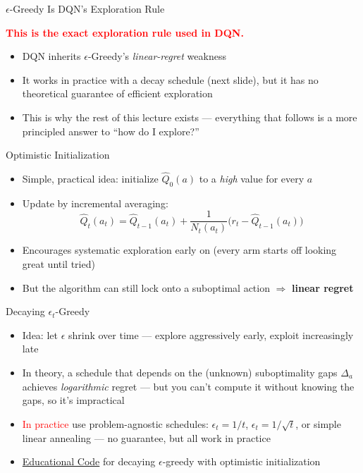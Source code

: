 \begin{frame}{$\epsilon$-Greedy Is DQN's Exploration Rule}
\vspace{0.5em}
\begin{center}
\textcolor{red}{\textbf{This is the exact exploration rule used in DQN.}}
\end{center}
\vspace{1em}
\begin{itemize}
    \setlength{\itemsep}{0.6em}
    \item DQN inherits $\epsilon$-Greedy's \emph{linear-regret} weakness
    \item It works in practice with a decay schedule (next slide), but it has no theoretical guarantee of efficient exploration
    \item This is why the rest of this lecture exists --- everything that follows is a more principled answer to ``how do I explore?''
\end{itemize}
\end{frame}

\begin{frame}{Optimistic Initialization}
\begin{itemize}
    \setlength{\itemsep}{0.45em}
    \item Simple, practical idea: initialize $\hat{Q}_0(a)$ to a \emph{high} value for every $a$
    \item Update by incremental averaging:
    \[
        \hat{Q}_t(a_t) = \hat{Q}_{t-1}(a_t) + \frac{1}{N_t(a_t)} \big(r_t - \hat{Q}_{t-1}(a_t)\big)
    \]
    \item Encourages systematic exploration early on (every arm starts off looking great until tried)
    \item But the algorithm can still lock onto a suboptimal action $\Rightarrow$ \textbf{linear regret}
\end{itemize}
\end{frame}

\begin{frame}{Decaying $\epsilon_t$-Greedy}
\begin{itemize}
    \setlength{\itemsep}{0.65em}
    \item Idea: let $\epsilon$ shrink over time --- explore aggressively early, exploit increasingly late
    \item In theory, a schedule that depends on the (unknown) suboptimality gaps $\Delta_a$ achieves \emph{logarithmic} regret --- but you can't compute it without knowing the gaps, so it's impractical
    \item \textcolor{red}{In practice} use problem-agnostic schedules: $\epsilon_t = 1/t$, $\epsilon_t = 1/\sqrt{t}$, or simple linear annealing --- no guarantee, but all work in practice
    \item \href{https://github.com/TikhonJelvis/RL-book/blob/master/rl/chapter14/epsilon_greedy.py}{Educational Code} for decaying $\epsilon$-greedy with optimistic initialization
\end{itemize}
\end{frame}

